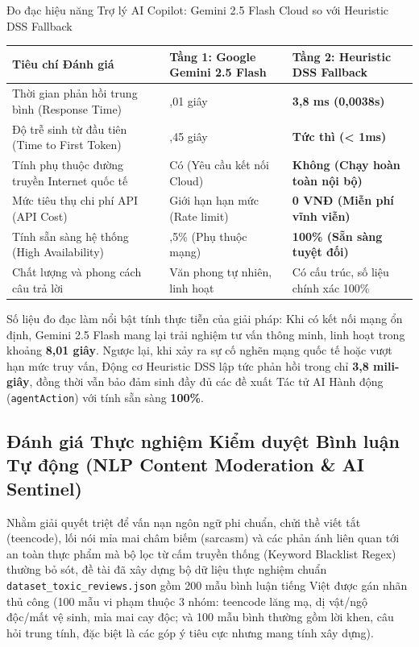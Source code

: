 \documentclass{uetgraduation}
\begin{document}
\begin{table}[!htbp]{Đo đạc hiệu năng Trợ lý AI Copilot: Gemini 2.5 Flash Cloud so với Heuristic DSS Fallback}
\centering
\small
\begin{tabularx}{\textwidth}{|>{\raggedright\arraybackslash}p{4.8cm}|>{\raggedright\arraybackslash}X|>{\raggedright\arraybackslash}X|}
\hline
\textbf{Tiêu chí Đánh giá} & \textbf{Tầng 1: Google Gemini 2.5 Flash} & \textbf{Tầng 2: Heuristic DSS Fallback} \\ \hline
Thời gian phản hồi trung bình (Response Time) & 8,01 giây & \textbf{3,8 ms (0,0038s)} \\ \hline
Độ trễ sinh từ đầu tiên (Time to First Token) & 1,45 giây & \textbf{Tức thì (< 1ms)} \\ \hline
Tính phụ thuộc đường truyền Internet quốc tế & Có (Yêu cầu kết nối Cloud) & \textbf{Không (Chạy hoàn toàn nội bộ)} \\ \hline
Mức tiêu thụ chi phí API (API Cost) & Giới hạn hạn mức (Rate limit) & \textbf{0 VNĐ (Miễn phí vĩnh viễn)} \\ \hline
Tính sẵn sàng hệ thống (High Availability) & 98,5\% (Phụ thuộc mạng) & \textbf{100\% (Sẵn sàng tuyệt đối)} \\ \hline
Chất lượng và phong cách câu trả lời & Văn phong tự nhiên, linh hoạt & Có cấu trúc, số liệu chính xác 100\% \\ \hline
\end{tabularx}
\end{table}

Số liệu đo đạc làm nổi bật tính thực tiễn của giải pháp: Khi có kết nối mạng ổn định, Gemini 2.5 Flash mang lại trải nghiệm tư vấn thông minh, linh hoạt trong khoảng \textbf{8,01 giây}. Ngược lại, khi xảy ra sự cố nghẽn mạng quốc tế hoặc vượt hạn mức truy vấn, Động cơ Heuristic DSS lập tức phản hồi trong chỉ \textbf{3,8 mili-giây}, đồng thời vẫn bảo đảm sinh đầy đủ các đề xuất Tác tử AI Hành động (\texttt{agentAction}) với tính sẵn sàng \textbf{100\%}.

\clearpage
\subsection{Đánh giá Thực nghiệm Kiểm duyệt Bình luận Tự động (NLP Content Moderation \& AI Sentinel)}
Nhằm giải quyết triệt để vấn nạn ngôn ngữ phi chuẩn, chửi thề viết tắt (teencode), lối nói mỉa mai châm biếm (sarcasm) và các phản ánh liên quan tới an toàn thực phẩm mà bộ lọc từ cấm truyền thống (Keyword Blacklist Regex) thường bỏ sót, đề tài đã xây dựng bộ dữ liệu thực nghiệm chuẩn \texttt{dataset\_toxic\_reviews.json} gồm 200 mẫu bình luận tiếng Việt được gán nhãn thủ công (100 mẫu vi phạm thuộc 3 nhóm: teencode lăng mạ, dị vật/ngộ độc/mất vệ sinh, mỉa mai cay độc; và 100 mẫu bình thường gồm lời khen, câu hỏi trung tính, đặc biệt là các góp ý tiêu cực nhưng mang tính xây dựng). 
\end{document}
